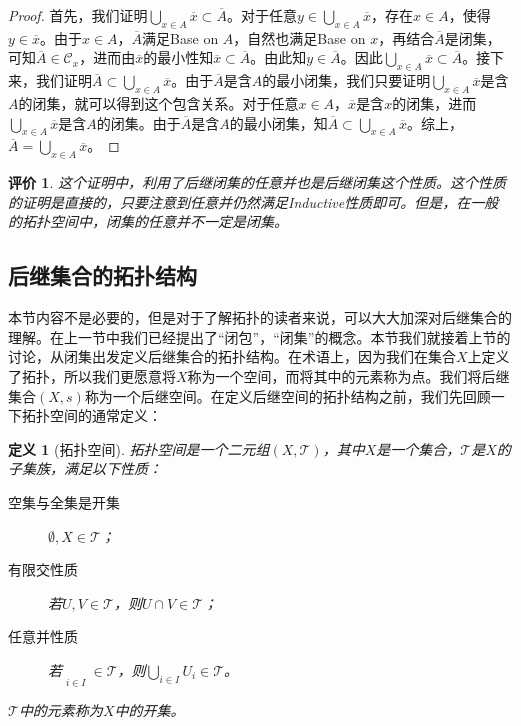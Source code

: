 \documentclass[oneside, 12pt]{ctexart}
\newtheorem{definition}{定义}[section]
\newtheorem{remark}{评价}[section]
\begin{document}
\begin{proof}
	首先，我们证明$\bigcup_{x \in A}\overline{x} \subset \overline{A}$。对于任意$y \in \bigcup_{x \in A}\overline{x}$，存在$x \in A$，使得$y \in \overline{x}$。由于$x \in A$，$\overline{A}$满足Base on $A$，自然也满足Base on $x$，再结合$\overline{A}$是闭集，可知$\overline{A} \in \mathcal{C}_x$，进而由$\overline{x}$的最小性知$\overline{x} \subset \overline{A}$。由此知$y \in \overline{A}$。因此$\bigcup_{x \in A}\overline{x} \subset \overline{A}$。接下来，我们证明$\overline{A} \subset \bigcup_{x \in A}\overline{x}$。由于$\overline{A}$是含$A$的最小闭集，我们只要证明$\bigcup_{x \in A}\overline{x}$是含$A$的闭集，就可以得到这个包含关系。对于任意$x \in A$，$\overline{x}$是含$x$的闭集，进而$\bigcup_{x \in A}\overline{x}$是含$A$的闭集。由于$\overline{A}$是含$A$的最小闭集，知$\overline{A} \subset \bigcup_{x \in A}\overline{x}$。综上，$\overline{A} = \bigcup_{x \in A}\overline{x}$。
\end{proof}

\begin{remark}
	这个证明中，利用了后继闭集的任意并也是后继闭集这个性质。这个性质的证明是直接的，只要注意到任意并仍然满足Inductive性质即可。但是，在一般的拓扑空间中，闭集的任意并不一定是闭集。
\end{remark}

\subsection{后继集合的拓扑结构}

本节内容不是必要的，但是对于了解拓扑的读者来说，可以大大加深对后继集合的理解。在上一节中我们已经提出了“闭包”，“闭集”的概念。本节我们就接着上节的讨论，从闭集出发定义后继集合的拓扑结构。在术语上，因为我们在集合$X$上定义了拓扑，所以我们更愿意将$X$称为一个空间，而将其中的元素称为点。我们将后继集合$(X, s)$称为一个后继空间。在定义后继空间的拓扑结构之前，我们先回顾一下拓扑空间的通常定义：

\begin{definition}[拓扑空间]
	拓扑空间是一个二元组$(X, \mathcal{T})$，其中$X$是一个集合，$\mathcal{T}$是$X$的子集族，满足以下性质：
	\begin{description}
		\item[空集与全集是开集] $\emptyset, X \in \mathcal{T}$；
		\item[有限交性质] 若$U, V \in \mathcal{T}$，则$U \cap V \in \mathcal{T}$；
		\item[任意并性质] 若$\mathop{U_i}\limits_{i \in I} \in \mathcal{T}$，则$\bigcup\limits_{i \in I} U_i \in \mathcal{T}$。
	\end{description}
	$\mathcal{T}$中的元素称为$X$中的开集。
\end{definition}
\end{document}
